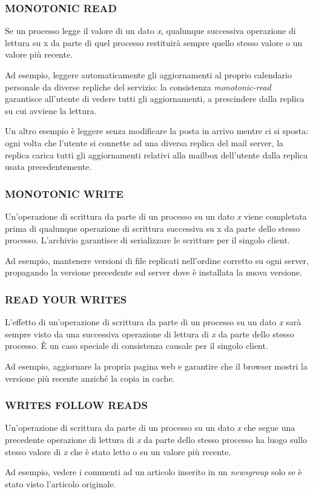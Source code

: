\subsubsection{MONOTONIC READ}
Se un processo legge il valore di un dato \textit{x}, qualunque successiva operazione di lettura su x da parte di quel processo restituirà sempre quello stesso valore o un valore più recente.

Ad esempio, leggere automaticamente gli aggiornamenti al proprio calendario personale da diverse repliche del servizio: la consistenza \textit{monotonic-read} garantisce all'utente di vedere tutti gli aggiornamenti, a prescindere dalla replica su cui avviene la lettura.

Un altro esempio è leggere senza modificare la posta in arrivo mentre ci si sposta: ogni volta che l'utente si connette ad una diversa replica del mail server, la replica carica tutti gli aggiornamenti relativi alla mailbox dell'utente dalla replica usata precedentemente.

\subsubsection{MONOTONIC WRITE}
Un'operazione di scrittura da parte di un processo su un dato \textit{x} viene completata prima di qualunque operazione di scrittura successiva su x da parte dello stesso processo. L'archivio garantisce di serializzare le scritture per il singolo client.

Ad esempio, mantenere versioni di file replicati nell'ordine corretto su ogni server, propagando la versione precedente sul server dove è installata la nuova versione.

\subsubsection{READ YOUR WRITES}
L'effetto di un'operazione di scrittura da parte di un processo su un dato \textit{x} sarà sempre visto da una successiva operazione di lettura di \textit{x} da parte dello stesso processo. È un caso speciale di consistenza causale per il singolo client.

Ad esempio, aggiornare la propria pagina web e garantire che il browser mostri la versione più recente anziché la copia in cache.

\subsubsection{WRITES FOLLOW READS}
Un'operazione di scrittura da parte di un processo su un dato \textit{x} che segue una precedente operazione di lettura di \textit{x} da parte dello stesso processo ha luogo sullo stesso valore di \textit{x} che è stato letto o su un valore più recente.

Ad esempio, vedere i commenti ad un articolo inserito in un \textit{newsgroup} solo se è stato visto l'articolo originale.


